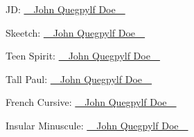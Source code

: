 \documentclass{article}
\begin{document}
JD: {\ECFJD\setul{0.1ex}{}\ul{~~John Quegpylf Doe~~}}

Skeetch: {\ECFSkeetch\setul{0.1ex}{}\ul{~~John Quegpylf Doe~~}}

Teen Spirit: {\ECFTeenSpirit\setul{-0.1ex}{0.3pt}\ul{~~John Quegpylf Doe~~}}

Tall Paul: {\ECFTallPaul\setul{0.15ex}{}\ul{~~John Quegpylf Doe~~}}

French Cursive: {\cursive\setul{0.1ex}{}\ul{~~John Quegpylf Doe~~}}

Insular Minuscule: {\iminfamily\setul{0.1ex}{}\ul{~~John Quegpylf Doe~~}}
\end{document}
